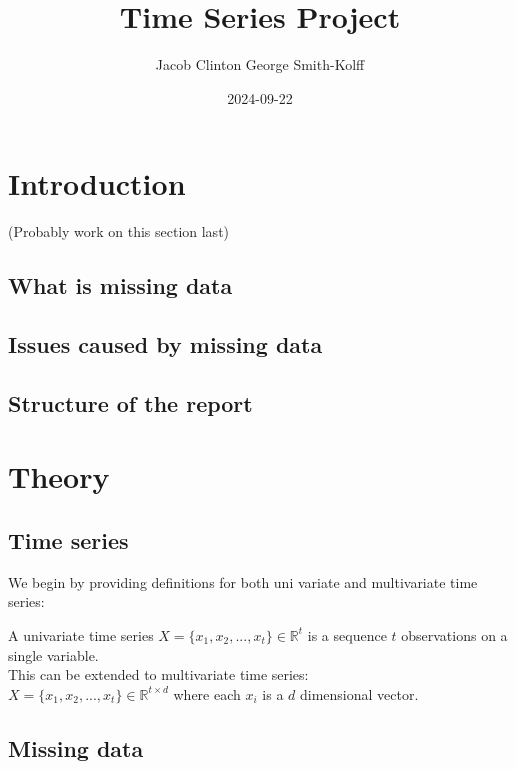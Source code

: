 \documentclass[
]{report}
\title{Time Series Project}
\author{Jacob Clinton George Smith-Kolff}
\date{2024-09-22}
\begin{document}
\maketitle

{
\setcounter{tocdepth}{1}
\tableofcontents
}
\chapter{Introduction}\label{introduction}

(Probably work on this section last)

\section{What is missing data}\label{what-is-missing-data}

\section{Issues caused by missing
data}\label{issues-caused-by-missing-data}

\section{Structure of the report}\label{structure-of-the-report}

\chapter{Theory}\label{theory}

\section{Time series}\label{time-series}

We begin by providing definitions for both uni variate and multivariate
time series:

A univariate time series \(X = \{x_1, x_2, ..., x_t\} \in \mathbb{R}^t\)
is a sequence \(t\) observations on a single variable.\\
This can be extended to multivariate time series:\\
\(X = \{x_1, x_2, ..., x_t\}\in \mathbb{R}^{t\times d}\) where each
\(x_i\) is a \(d\) dimensional vector.

\section{Missing data}\label{missing-data}
\end{document}
